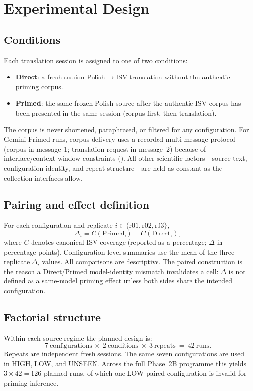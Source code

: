 \section{Experimental Design}
\label{sec:design}

\subsection{Conditions}
Each translation session is assigned to one of two conditions:

\begin{itemize}[leftmargin=*]
  \item \textbf{Direct}: a fresh-session Polish$\rightarrow$ISV translation without the authentic priming corpus.
  \item \textbf{Primed}: the same frozen Polish source after the authentic ISV corpus has been presented in the same session (corpus first, then translation).
\end{itemize}

The corpus is never shortened, paraphrased, or filtered for any configuration.
For Gemini Primed runs, corpus delivery uses a recorded multi-message protocol (corpus in message~1; translation request in message~2) because of interface/context-window constraints ().
All other scientific factors---source text, configuration identity, and repeat structure---are held as constant as the collection interfaces allow.

\subsection{Pairing and effect definition}
For each configuration and replicate $i\in\{\mathrm{r01},\mathrm{r02},\mathrm{r03}\}$,
\[
\Delta_i = C(\mathrm{Primed}_i) - C(\mathrm{Direct}_i),
\]
where $C$ denotes canonical ISV coverage (reported as a percentage; $\Delta$ in percentage points).
Configuration-level summaries use the mean of the three replicate $\Delta_i$ values.
All comparisons are descriptive.
The paired construction is the reason a Direct/Primed model-identity mismatch invalidates a cell: $\Delta$ is not defined as a same-model priming effect unless both sides share the intended configuration.

\subsection{Factorial structure}
Within each source regime the planned design is:
\[
7\ \text{configurations}\ \times\ 2\ \text{conditions}\ \times\ 3\ \text{repeats}\ =\ 42\ \text{runs}.
\]
Repeats are independent fresh sessions.
The same seven configurations are used in HIGH, LOW, and UNSEEN.
Across the full Phase~2B programme this yields $3\times 42=126$ planned runs, of which one LOW paired configuration is invalid for priming inference.

